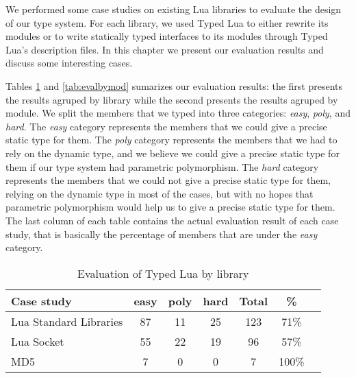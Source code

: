 We performed some case studies on existing Lua libraries
to evaluate the design of our type system.
For each library, we used Typed Lua to either rewrite its modules
or to write statically typed interfaces to its modules through
Typed Lua's description files.
In this chapter we present our evaluation results and discuss
some interesting cases.

Tables \ref{tab:evalbylib} and \ref{tab:evalbymod} sumarizes our
evaluation results:
the first presents the results agruped by library while
the second presents the results agruped by module.
We split the members that we typed into three categories:
\emph{easy}, \emph{poly}, and \emph{hard}.
The \emph{easy} category represents the members that we could give
a precise static type for them.
The \emph{poly} category represents the members that we had to
rely on the dynamic type, and we believe we could give a precise
static type for them if our type system had parametric polymorphism.
The \emph{hard} category represents the members that we could not
give a precise static type for them, relying on the dynamic type
in most of the cases, but with no hopes that parametric polymorphism
would help us to give a precise static type for them.
The last column of each table contains the actual evaluation result
of each case study, that is basically the percentage of members
that are under the \emph{easy} category.

\begin{table}[!ht]
\begin{center}
\begin{tabular}{|l|c|c|c|c|c|c|}
\hline
\textbf{Case study} & \textbf{easy} & \textbf{poly} & \textbf{hard} & \textbf{Total} & \textbf{\%} \\
\hline
Lua Standard Libraries & 87 & 11 & 25 & 123 & 71\% \\
\hline
Lua Socket & 55 & 22 & 19 & 96 & 57\% \\
\hline
MD5 & 7 & 0 & 0 & 7 & 100\% \\
\hline
\end{tabular}
\end{center}
\caption{Evaluation of Typed Lua by library}
\label{tab:evalbylib}
\end{table}

